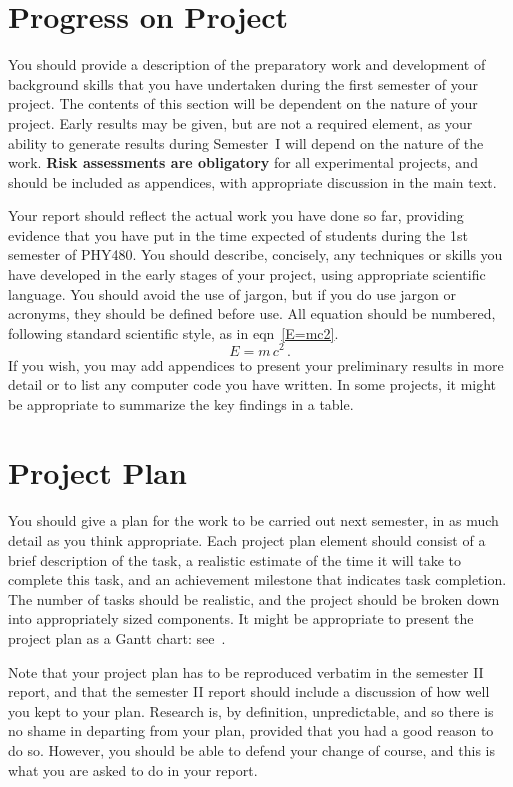 \documentclass[a4paper,11pt]{article}
\begin{document}
\section{Progress on Project}
You should provide a description of the preparatory work and development of background skills that you have undertaken during the first semester of your project. The contents of this section will be dependent on the nature of your project. Early results may be given, but are not a required element, as your ability to generate results during Semester~I will depend on the nature of the work. \textbf{Risk assessments are obligatory} for all experimental projects, and should be included as appendices, with appropriate discussion in the main text.

Your report should reflect the actual work you have done so far, providing evidence that you have put in the time expected of students during the 1st semester of PHY480. You should describe, concisely, any techniques or skills you have developed in the early stages of your project,
using appropriate scientific language. You should avoid the use of jargon, but if you do use jargon or acronyms, they should be defined before use. All equation should be numbered, following standard scientific style, as in eqn~\ref{E=mc2}.
\begin{equation}
\label{E=mc2}
E = m\,c^2 \, .
\end{equation}
If you wish, you may add appendices to present your preliminary results in more detail or to list any computer code you have written. In some projects, it might be appropriate to summarize the key findings in a table.



\section{Project Plan}
You should give a plan for the work to be carried out next semester, in as much detail as you think appropriate. Each project plan element should consist of a brief description of the task, a realistic estimate of the time it will take to complete this task, and an achievement milestone that indicates task completion. The number of tasks should be realistic, and the project should be broken down into appropriately sized components. It might be appropriate to present the project plan as a Gantt chart: see~\cite{gannt}.

Note that your project plan has to be reproduced verbatim in the semester II report, and that the semester II report should include a discussion of how well you kept to your plan. Research is, by definition, unpredictable, and so there is no shame in departing from your plan, provided that you had a good reason to do so. However, you should be able to defend your change of course, and this is what you are asked to do in your report.  
\end{document}
